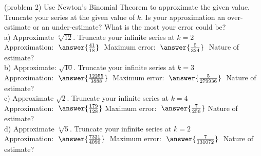 \documentclass[handout]{ximera}
\begin{document}
\begin{problem}(problem 2) Use Newton's Binomial Theorem to approximate the given value. Truncate your series at the given value of $k$.
 Is your approximation an over-estimate or an under-estimate? What is the most your error could be?\\
a) Approximate $\sqrt[3]{12}$. Truncate your infinite series at $k = 2$ \\
Approximation: $\; \answer{\frac{41}{18}}\;$  
Maximum error: $\; \answer{\frac{5}{324}}\; $
Nature of estimate? 
 \\

b) Approximate: $\sqrt{10}$. Truncate your infinite series at $k = 3$ \\ 
Approximation: $\; \answer{\frac{12255}{3888}}\;$ 
Maximum error: $\; \answer{\frac{5}{279936}}\;$ 
Nature of estimate? \\

c) Approximate $\sqrt{2}$. Truncate your infinite series at $k = 4$ \\ 
Approximation: $\; \answer{\frac{179}{128}}$ 
Maximum error: $\; \answer{\frac{7}{256}}$
Nature of estimate? \\

d) Approximate $\sqrt[4]{5}$. Truncate your infinite series at $k = 2$ \\ 
Approximation: $\; \answer{\frac{7321}{4096}}\;$ 
Maximum error: $\; \answer{\frac{7}{131072}}\;$ 
Nature of estimate? \\


\end{problem}
\end{document}
